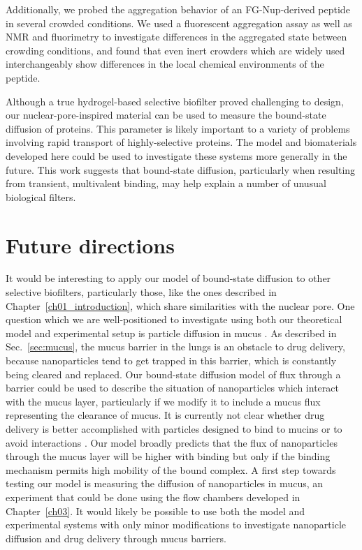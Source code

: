 Additionally, we probed the aggregation behavior of an FG-Nup-derived peptide in several crowded conditions.  We used a fluorescent aggregation assay as well as NMR and fluorimetry to investigate differences in the aggregated state between crowding conditions, and found that even inert crowders which are widely used interchangeably show differences in the local chemical environments of the peptide.

Although a true hydrogel-based selective biofilter proved challenging to design, our nuclear-pore-inspired material can be used to measure the bound-state diffusion of proteins.  This parameter is likely important to a variety of problems involving rapid transport of highly-selective proteins.  The model and biomaterials developed here could be used to investigate these systems more generally in the future.  This work suggests that bound-state diffusion, particularly when resulting from transient, multivalent binding, may help explain a number of unusual biological filters.

\section{Future directions}

It would be interesting to apply our model of bound-state diffusion to other selective biofilters, particularly those, like the ones described in Chapter~\ref{ch01_introduction}, which share similarities with the nuclear pore.  One question which we are well-positioned to investigate using both our theoretical model and experimental setup is particle diffusion in mucus \cite{witten17,newby18}.  As described in Sec.~\ref{sec:mucus}, the mucus barrier in the lungs is an obstacle to drug delivery, because nanoparticles tend to get trapped in this barrier, which is constantly being cleared and replaced.  Our bound-state diffusion model of flux through a barrier could be used to describe the situation of nanoparticles which interact with the mucus layer, particularly if we modify it to include a mucus flux representing the clearance of mucus.  It is currently not clear whether drug delivery is better accomplished with particles designed to bind to mucins or to avoid interactions \cite{schneider17,lai11}.  Our model broadly predicts that the flux of nanoparticles through the mucus layer will be higher with binding but only if the binding mechanism permits high mobility of the bound complex.  A first step towards testing our model is measuring the diffusion of nanoparticles in mucus, an experiment that could be done using the flow chambers developed in Chapter~\ref{ch03}.  It would likely be possible to use both the model and experimental systems with only minor modifications to investigate nanoparticle diffusion and drug delivery through mucus barriers.

